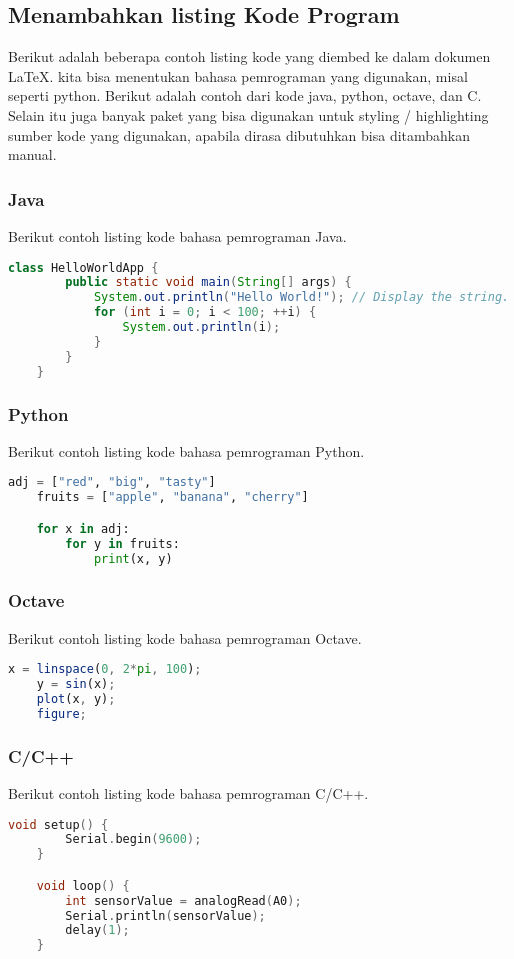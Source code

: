 \subsection{Menambahkan listing Kode Program}
Berikut adalah beberapa contoh listing kode yang diembed ke dalam dokumen \LaTeX. kita bisa menentukan bahasa pemrograman yang digunakan, misal seperti python. Berikut adalah contoh dari kode java, python, octave, dan C. Selain itu juga banyak paket yang bisa digunakan untuk styling / highlighting sumber kode yang digunakan, apabila dirasa dibutuhkan bisa ditambahkan manual.

\subsubsection{Java}
Berikut contoh listing kode bahasa pemrograman Java.
\begin{lstlisting}[language=java]
    class HelloWorldApp {
        public static void main(String[] args) {
            System.out.println("Hello World!"); // Display the string.
            for (int i = 0; i < 100; ++i) {
                System.out.println(i);
            }
        }
    }
    \end{lstlisting}

\subsubsection{Python}
Berikut contoh listing kode bahasa pemrograman Python.
\begin{lstlisting}[language=python]
    adj = ["red", "big", "tasty"]
    fruits = ["apple", "banana", "cherry"]

    for x in adj:
        for y in fruits:
            print(x, y)
    \end{lstlisting}

\subsubsection{Octave}
Berikut contoh listing kode bahasa pemrograman Octave.
\begin{lstlisting}[language=octave]
    x = linspace(0, 2*pi, 100);
    y = sin(x);
    plot(x, y);
    figure;
    \end{lstlisting}

\subsubsection{C/C++}
Berikut contoh listing kode bahasa pemrograman C/C++.
\begin{lstlisting}[language=C]
    void setup() {
        Serial.begin(9600);
    }

    void loop() {
        int sensorValue = analogRead(A0);
        Serial.println(sensorValue);
        delay(1);
    }
    \end{lstlisting}

